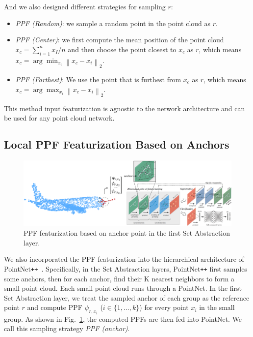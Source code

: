 \documentclass{article}
\newcommand{\norm}[1]{\left\lVert#1\right\rVert}
\begin{document}
And we also designed different strategies for sampling $r$:
\begin{itemize}
    \item \textit{PPF (Random)}: we sample a random point in the point cloud as $r$. 
    \item \textit{PPF (Center)}: we first compute the mean position of the point cloud $x_c=\sum_{i=1}^n x_I / n$ and then choose the point closest to $x_c$ as $r$, which means $x_c = \arg\min_{x_i} \norm{x_c-x_i}_2$. 
    \item \textit{PPF (Farthest)}: We use the point that is furthest from $x_c$ as $r$, which means $x_c = \arg\max_{x_i} \norm{x_c-x_i}_2$. 
\end{itemize}

This method input featurization is agnostic to the network architecture and can be used for any point cloud network. 

\subsection{Local PPF Featurization Based on Anchors}
\label{section:PPF_anchor}

\begin{figure}[hbt!]
\centering
    \includegraphics[width=.9\linewidth]{images/pn2_input.png}
    \caption{PPF featurization based on anchor point in the first Set Abstraction layer.}
\label{fig:pn2_input}
\end{figure}

We also incorporated the PPF featurization into the hierarchical architecture of PointNet\texttt{++}~\cite{qi2017pointnet2}. Specifically, in the Set Abstraction layers, PointNet\texttt{++} first samples some anchors, then for each anchor, find their K nearest neighbors to form a small point cloud. Each small point cloud runs through a PointNet. In the first Set Abstraction layer, we treat the sampled anchor of each group as the reference point $r$ and compute PPF $\psi_{r, x_i}$ ($i\in\{1,..., k\}$) for every point $x_i$ in the small group. As shown in Fig.~\ref{fig:pn2_input}, the computed PPFs are then fed into PointNet. We call this sampling strategy \textit{PPF (anchor)}.
\end{document}
